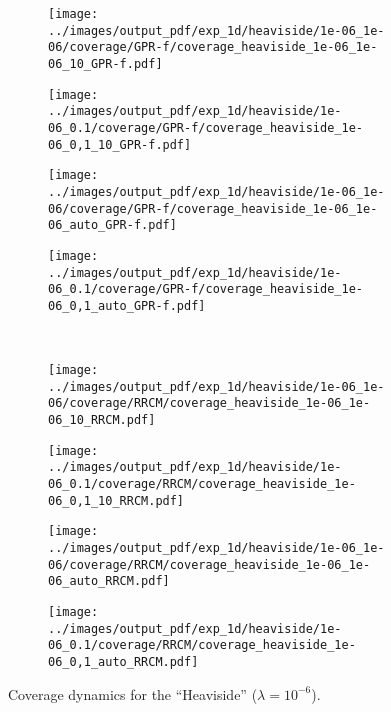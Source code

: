 \documentclass[10pt, conference, compsocconf]{IEEEtran}
\begin{document}
\begin{figure}%
  \centering
  \begin{subfigure}[b]{0.25\linewidth}
    \texttt{[image: ../images/output\_pdf/exp\_1d/heaviside/1e-06\_1e-06/coverage/GPR-f/coverage\_heaviside\_1e-06\_1e-06\_10\_GPR-f.pdf]}
  \end{subfigure}%
  \begin{subfigure}[b]{0.25\linewidth}
    \texttt{[image: ../images/output\_pdf/exp\_1d/heaviside/1e-06\_0.1/coverage/GPR-f/coverage\_heaviside\_1e-06\_0,1\_10\_GPR-f.pdf]}
  \end{subfigure}%
  \begin{subfigure}[b]{0.25\linewidth}
    \texttt{[image: ../images/output\_pdf/exp\_1d/heaviside/1e-06\_1e-06/coverage/GPR-f/coverage\_heaviside\_1e-06\_1e-06\_auto\_GPR-f.pdf]}
  \end{subfigure}%
  \begin{subfigure}[b]{0.25\linewidth}
    \texttt{[image: ../images/output\_pdf/exp\_1d/heaviside/1e-06\_0.1/coverage/GPR-f/coverage\_heaviside\_1e-06\_0,1\_auto\_GPR-f.pdf]}
  \end{subfigure}\\
  \begin{subfigure}[b]{0.25\linewidth}
    \texttt{[image: ../images/output\_pdf/exp\_1d/heaviside/1e-06\_1e-06/coverage/RRCM/coverage\_heaviside\_1e-06\_1e-06\_10\_RRCM.pdf]}
  \end{subfigure}%
  \begin{subfigure}[b]{0.25\linewidth}
    \texttt{[image: ../images/output\_pdf/exp\_1d/heaviside/1e-06\_0.1/coverage/RRCM/coverage\_heaviside\_1e-06\_0,1\_10\_RRCM.pdf]}
  \end{subfigure}%
  \begin{subfigure}[b]{0.25\linewidth}
    \texttt{[image: ../images/output\_pdf/exp\_1d/heaviside/1e-06\_1e-06/coverage/RRCM/coverage\_heaviside\_1e-06\_1e-06\_auto\_RRCM.pdf]}
  \end{subfigure}%
  \begin{subfigure}[b]{0.25\linewidth}
    \texttt{[image: ../images/output\_pdf/exp\_1d/heaviside/1e-06\_0.1/coverage/RRCM/coverage\_heaviside\_1e-06\_0,1\_auto\_RRCM.pdf]}
  \end{subfigure}
  \caption{Coverage dynamics for the ``Heaviside'' ($\lambda=10^{-6}$).}
  \label{fig:heaviside_1d_low_noise}
\end{figure}
\end{document}
